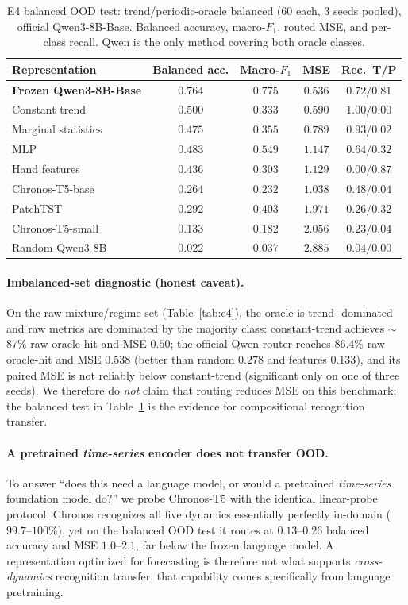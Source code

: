 \documentclass{article}
\begin{document}
\begin{table}[t]
\centering
\small
\begin{tabular}{lcccc}
\toprule
Representation & Balanced acc. & Macro-$F_1$ & MSE & Rec.\ T/P \\
\midrule
\textbf{Frozen Qwen3-8B-Base} & $\mathbf{0.764}$ & $\mathbf{0.775}$ & $\mathbf{0.536}$ & $0.72/0.81$ \\
Constant trend & $0.500$ & $0.333$ & $0.590$ & $1.00/0.00$ \\
Marginal statistics & $0.475$ & $0.355$ & $0.789$ & $0.93/0.02$ \\
MLP & $0.483$ & $0.549$ & $1.147$ & $0.64/0.32$ \\
Hand features & $0.436$ & $0.303$ & $1.129$ & $0.00/0.87$ \\
Chronos-T5-base & $0.264$ & $0.232$ & $1.038$ & $0.48/0.04$ \\
PatchTST & $0.292$ & $0.403$ & $1.971$ & $0.26/0.32$ \\
Chronos-T5-small & $0.133$ & $0.182$ & $2.056$ & $0.23/0.04$ \\
Random Qwen3-8B & $0.022$ & $0.037$ & $2.885$ & $0.04/0.00$ \\
\bottomrule
\end{tabular}
\caption{E4 balanced OOD test: trend/periodic-oracle balanced (60 each, 3
seeds pooled), official Qwen3-8B-Base.  Balanced accuracy, macro-$F_1$, routed
MSE, and per-class recall.  Qwen is the only method covering both oracle
classes.}
\label{tab:e4bal}
\end{table}

\paragraph{Imbalanced-set diagnostic (honest caveat).}
On the raw mixture/regime set (Table~\ref{tab:e4}), the oracle is trend-
dominated and raw metrics are dominated by the majority class: constant-trend
achieves $\sim$87\% raw oracle-hit and MSE $0.50$; the official Qwen router
reaches $86.4\%$ raw oracle-hit and MSE $0.538$ (better than random $0.278$ and
features $0.133$), and its paired MSE is not reliably below constant-trend
(significant only on one of three seeds).  We therefore do \emph{not} claim
that routing reduces MSE on this benchmark; the balanced test in
Table~\ref{tab:e4bal} is the evidence for compositional recognition transfer.

\paragraph{A pretrained \emph{time-series} encoder does not transfer OOD.}
To answer ``does this need a language model, or would a pretrained
\emph{time-series} foundation model do?'' we probe Chronos-T5
\citep{ansari2024chronos} with the identical linear-probe protocol.  Chronos
recognizes all five dynamics essentially perfectly in-domain ($99.7$--$100\%$),
yet on the balanced OOD test it routes at $0.13$--$0.26$ balanced accuracy and
MSE $1.0$--$2.1$, far below the frozen language model.  A representation
optimized for forecasting is therefore not what supports \emph{cross-dynamics}
recognition transfer; that capability comes specifically from language
pretraining.
\end{document}
